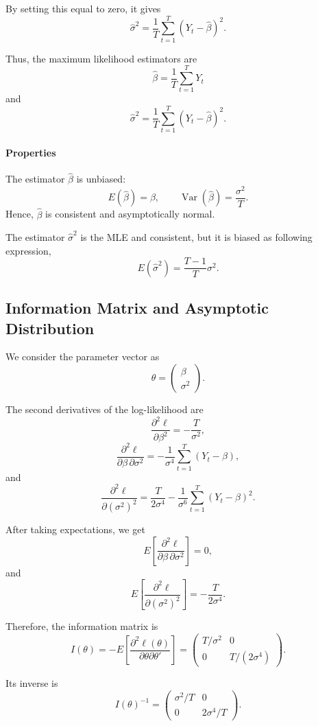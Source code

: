 \documentclass[12pt]{article}
\begin{document}
By setting this equal to zero, it gives
\[
\hat{\sigma}^2
=
\frac{1}{T}\sum_{t=1}^T (Y_t-{\hat \beta})^2.
\]

Thus, the maximum likelihood estimators are
\[
\boxed{
\hat{\beta}=\frac{1}{T}\sum_{t=1}^T Y_t
}
\]
and
\[
\boxed{
\hat{\sigma}^2=\frac{1}{T}\sum_{t=1}^T (Y_t-\hat \beta)^2
}.
\]

\paragraph{Properties}

The estimator \({\hat \beta}\) is unbiased:
\[
E({\hat \beta})=\beta,
\qquad
\operatorname{Var}({\hat \beta})=\frac{\sigma^2}{T}.
\]
Hence, \({\hat \beta}\) is consistent and asymptotically normal.

The estimator \(\hat{\sigma}^2\) is the MLE and consistent, but it is biased as following expression,
\[
E(\hat{\sigma}^2)=\frac{T-1}{T}\sigma^2.
\]

\subsection{Information Matrix and Asymptotic Distribution}

We consider the parameter vector as
\[
\theta=
\begin{pmatrix}
\beta\\
\sigma^2
\end{pmatrix}.
\]

The second derivatives of the log-likelihood are
\[
\frac{\partial^2 \ell}{\partial \beta^2}
=
-\frac{T}{\sigma^2},
\]
\[
\frac{\partial^2 \ell}{\partial \beta \,\partial \sigma^2}
=
-\frac{1}{\sigma^4}\sum_{t=1}^T(Y_t-\beta),
\]
and
\[
\frac{\partial^2 \ell}{\partial (\sigma^2)^2}
=
\frac{T}{2\sigma^4}
-
\frac{1}{\sigma^6}\sum_{t=1}^T(Y_t-\beta)^2.
\]

After taking expectations, we get
\[
E\left[\frac{\partial^2 \ell}{\partial \beta \,\partial \sigma^2}\right]=0,
\]
and
\[
E\left[\frac{\partial^2 \ell}{\partial (\sigma^2)^2}\right]
=
-\frac{T}{2\sigma^4}.
\]

Therefore, the information matrix is
\[
I(\theta)
=
-E\left[
\frac{\partial^2 \ell(\theta)}{\partial \theta \partial \theta'}
\right]
=
\begin{pmatrix}
T/\sigma^2 & 0\\
0 & T/(2\sigma^4)
\end{pmatrix}.
\]

Its inverse is
\[
I(\theta)^{-1}
=
\begin{pmatrix}
\sigma^2/T & 0\\
0 & 2\sigma^4/T
\end{pmatrix}.
\]
\end{document}
